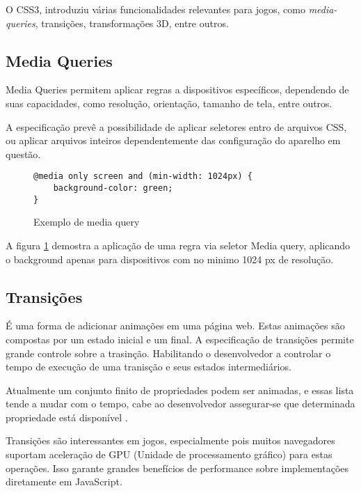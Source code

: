 O CSS3, introduziu várias funcionalidades relevantes para jogos, como
\textit{media-queries}, transições, transformações 3D, entre outros.

\subsection{Media Queries}

Media Queries permitem aplicar regras a dispositivos específicos, dependendo de suas
capacidades, como resolução, orientação, tamanho de tela, entre outros.

A especificação prevê a possibilidade de aplicar seletores  entro de arquivos
CSS, ou aplicar arquivos inteiros dependentemente das configuração do aparelho
em questão.


\begin{figure}
\centering
\begin{verbatim}
@media only screen and (min-width: 1024px) {
    background-color: green;
}
\end{verbatim}
\caption{Exemplo de media query}
\label{fig:MediaQuery}
\end{figure}

A figura \ref{fig:MediaQuery} demostra a aplicação de uma regra via seletor 
Media query, aplicando o background apenas para dispositivos com no minimo  
1024 px de resolução.


\subsection{Transições}

É uma forma de adicionar animações em uma página web.
Estas animações são compostas por um estado inicial e um
final. A especificação de transições permite grande controle
sobre a trasinção. Habilitando o desenvolvedor a controlar
o tempo de execução de uma tranisção e seus estados intermediários.

Atualmente um conjunto finito de propriedades podem ser animadas,
e essas lista tende a mudar com o tempo, cabe ao desenvolvedor
assegurar-se que determinada propriedade está disponível
\autocite{mdnTransitions}.

Transições são interessantes em jogos, especialmente pois muitos
navegadores suportam aceleração de GPU (Unidade de processamento
gráfico) para estas operações. Isso garante grandes benefícios de
performance sobre implementações diretamente em JavaScript.

